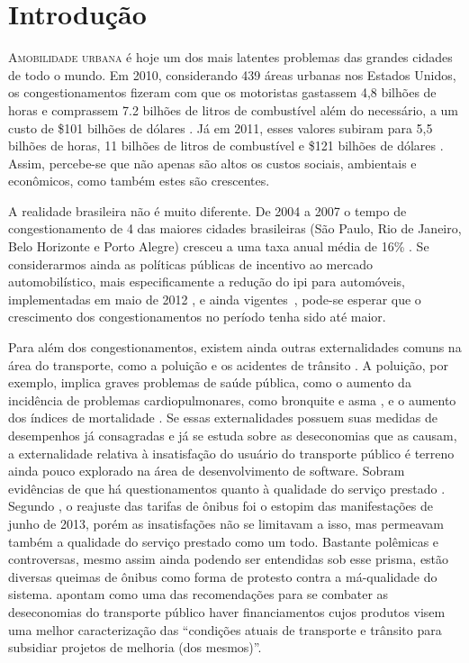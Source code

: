 \chapter{Introdução}
\label{chp:Introdução}

\lettrine{A}{mobilidade urbana} é hoje um dos mais latentes problemas das grandes cidades de todo o mundo. Em 2010, considerando 439 áreas urbanas nos Estados Unidos, os congestionamentos fizeram com que os motoristas gastassem 4,8 bilhões de horas e comprassem 7.2 bilhões de litros de combustível além do necessário, a um custo de \$101 bilhões de dólares \cite{Eisele2011}. Já em 2011, esses valores subiram para 5,5 bilhões de horas, 11 bilhões de litros de combustível e \$121 bilhões de dólares \cite{Schrank2012}. 
Assim, percebe-se que não apenas são altos os custos sociais, ambientais e econômicos, como também estes são crescentes.

A realidade brasileira não é muito diferente. De 2004 a 2007 o tempo de congestionamento de 4 das maiores cidades brasileiras (São Paulo, Rio de Janeiro, Belo Horizonte e Porto Alegre) cresceu a uma taxa anual média de 16\% \cite{resende2009}. Se considerarmos ainda as políticas públicas de incentivo ao mercado automobilístico, mais especificamente a redução do \gls{ipi} para automóveis, implementadas em maio de 2012 \cite{brasil2011}, e ainda vigentes~\cite{brasil2012}, pode-se esperar que o crescimento dos congestionamentos no período tenha sido até maior.

Para além dos congestionamentos, existem ainda outras externalidades comuns na área do transporte, como a poluição e os acidentes de trânsito \cite{vasconcellos1998}. A poluição, por exemplo, implica graves problemas de saúde pública, como o aumento da incidência de problemas cardiopulmonares, como bronquite e asma \cite{kunzli2000}, e o aumento dos índices de mortalidade \cite{finkelstein2004}.
Se essas externalidades possuem suas medidas de desempenhos já consagradas e já se estuda sobre as deseconomias que as causam, a externalidade relativa à insatisfação do usuário do transporte público é terreno ainda pouco explorado na área de desenvolvimento de software.
Sobram evidências de que há questionamentos quanto à qualidade do serviço prestado \cite{UrbanaPE2010,Rodrigues,Rodrigues2006,Cellos2012}. Segundo , o reajuste das tarifas de ônibus foi o estopim das manifestações de junho de 2013, porém as insatisfações não se limitavam a isso, mas permeavam também a qualidade do serviço prestado como um todo. Bastante polêmicas e controversas, mesmo assim ainda podendo ser entendidas sob esse prisma, estão diversas queimas de ônibus como forma de protesto contra a má-qualidade do sistema.  apontam como uma das recomendações para se combater as deseconomias do transporte público haver financiamentos cujos produtos visem uma melhor caracterização das ``condições atuais de transporte e trânsito para subsidiar projetos de melhoria (dos mesmos)''.

